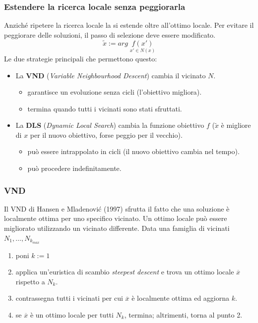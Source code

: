 \documentclass{article}
\begin{document}
\subsubsection{Estendere la ricerca locale senza peggiorarla}
Anziché ripetere la ricerca locale la si estende oltre all'ottimo locale. Per evitare il peggiorare
delle soluzioni, il passo di selezione deve essere modificato.
$$\tilde{x}:= arg\;\underset{x'\in N(x)}{f(x')}$$
Le due strategie principali che permettono questo:
\begin{itemize}
    \item La \textbf{VND} (\textit{Variable Neighbourhood Descent}) cambia il vicinato $N$.
    \begin{itemize}
        \item garantisce un evoluzione senza cicli (l'obiettivo migliora).
        \item termina quando tutti i vicinati sono stati sfruttati.
    \end{itemize}
    \item La \textbf{DLS} (\textit{Dynamic Local Search}) cambia la funzione obiettivo $f$
    ($\tilde{x}$ è migliore di $x$ per il nuovo obiettivo, forse peggio per il vecchio).
    \begin{itemize}
        \item può essere intrappolato in cicli (il nuovo obiettivo cambia nel tempo).
        \item può procedere indefinitamente.
    \end{itemize}
\end{itemize}

\subsubsection{VND}
Il VND di Hansen e Mladenović (1997) sfrutta il fatto che una soluzione è localmente ottima
per uno specifico vicinato. Un ottimo locale può essere migliorato utilizzando un vicinato
differente.
Data una famiglia di vicinati $N_1,\dots,N_{k_{max}}$
\begin{enumerate}
    \item poni $k:=1$
    \item applica un'euristica di scambio \textit{steepest descent} e trova un
    ottimo locale $\overline{x}$ rispetto a $N_k$.
    \item contrassegna tutti i vicinati per cui $\overline{x}$ è localmente ottima ed aggiorna
    $k$.
    \item se $\overline{x}$ è un ottimo locale per tutti $N_k$, termina; altrimenti, torna al punto 2.
\end{enumerate}
\end{document}
